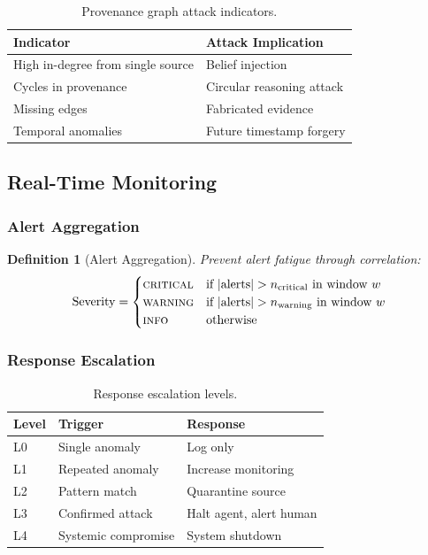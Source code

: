 \documentclass[
]{article}
\newtheorem{definition}{Definition}[section]
\begin{document}
\begin{table}[htbp]
\centering
\caption{Provenance graph attack indicators.}
\label{tab:provenance-indicators}
\begin{tabular}{@{}lp{6cm}@{}}
\toprule
Indicator & Attack Implication \\
\midrule
High in-degree from single source & Belief injection \\
Cycles in provenance & Circular reasoning attack \\
Missing edges & Fabricated evidence \\
Temporal anomalies & Future timestamp forgery \\
\bottomrule
\end{tabular}
\end{table}

\subsection{Real-Time Monitoring}\label{sec:monitoring}

\subsubsection{Alert Aggregation}\label{alert-aggregation}

\begin{definition}[Alert Aggregation]
\label{def:alert-aggregation}
Prevent alert fatigue through correlation:
\begin{equation}
\label{eq:alert-aggregation}
\text{Severity} = \begin{cases}
\textsc{critical} & \text{if } |\text{alerts}| > n_{\text{critical}} \text{ in window } w \\
\textsc{warning} & \text{if } |\text{alerts}| > n_{\text{warning}} \text{ in window } w \\
\textsc{info} & \text{otherwise}
\end{cases}
\end{equation}
\end{definition}

\subsubsection{Response Escalation}\label{response-escalation}

\begin{table}[htbp]
\centering
\caption{Response escalation levels.}
\label{tab:alert-escalation}
\begin{tabular}{@{}llp{4cm}@{}}
\toprule
Level & Trigger & Response \\
\midrule
L0 & Single anomaly & Log only \\
L1 & Repeated anomaly & Increase monitoring \\
L2 & Pattern match & Quarantine source \\
L3 & Confirmed attack & Halt agent, alert human \\
L4 & Systemic compromise & System shutdown \\
\bottomrule
\end{tabular}
\end{table}
\end{document}
